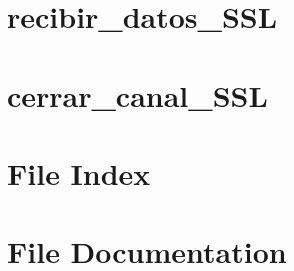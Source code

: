 \documentclass[twoside]{book}
\newcommand{\+}{\discretionary{\mbox{\scriptsize$\hookleftarrow$}}{}{}}
\newcommand{\clearemptydoublepage}{%
  \newpage{\pagestyle{empty}\cleardoublepage}%
}
\begin{document}
\chapter{recibir\+\_\+datos\+\_\+\+S\+SL}
\label{recibir_datos_SSL}
\hypertarget{recibir_datos_SSL}{}

\chapter{cerrar\+\_\+canal\+\_\+\+S\+SL}
\label{cerrar_canal_SSL}
\hypertarget{cerrar_canal_SSL}{}

\chapter{File Index}

\chapter{File Documentation}










\backmatter
\newpage
{}
\clearemptydoublepage
{}
\printindex
\end{document}
